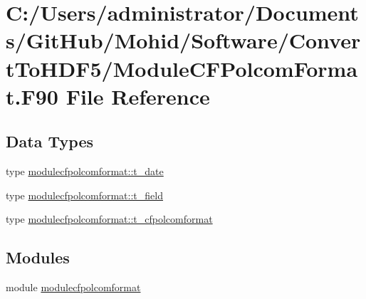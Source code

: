 \hypertarget{_module_c_f_polcom_format_8_f90}{}\section{C\+:/\+Users/administrator/\+Documents/\+Git\+Hub/\+Mohid/\+Software/\+Convert\+To\+H\+D\+F5/\+Module\+C\+F\+Polcom\+Format.F90 File Reference}
\label{_module_c_f_polcom_format_8_f90}
\subsection*{Data Types}
\begin{DoxyCompactItemize}
\item 
type \mbox{\hyperlink{structmodulecfpolcomformat_1_1t__date}{modulecfpolcomformat\+::t\+\_\+date}}
\item 
type \mbox{\hyperlink{structmodulecfpolcomformat_1_1t__field}{modulecfpolcomformat\+::t\+\_\+field}}
\item 
type \mbox{\hyperlink{structmodulecfpolcomformat_1_1t__cfpolcomformat}{modulecfpolcomformat\+::t\+\_\+cfpolcomformat}}
\end{DoxyCompactItemize}
\subsection*{Modules}
\begin{DoxyCompactItemize}
\item 
module \mbox{\hyperlink{namespacemodulecfpolcomformat}{modulecfpolcomformat}}
\end{DoxyCompactItemize}

